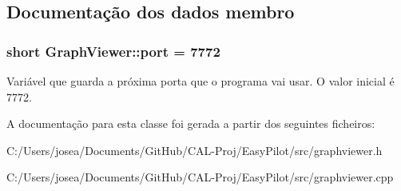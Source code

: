 \subsection{Documentação dos dados membro}
\hypertarget{class_graph_viewer_a89d0abe75f41feededc49497cc514342}{}
\subsubsection[{port}]{\setlength{\rightskip}{0pt plus 5cm}short Graph\+Viewer\+::port = 7772\hspace{0.3cm}{\ttfamily [static]}}\label{class_graph_viewer_a89d0abe75f41feededc49497cc514342}
Variável que guarda a próxima porta que o programa vai usar. O valor inicial é 7772. 

A documentação para esta classe foi gerada a partir dos seguintes ficheiros\+:\begin{DoxyCompactItemize}
\item 
C\+:/\+Users/josea/\+Documents/\+Git\+Hub/\+C\+A\+L-\/\+Proj/\+Easy\+Pilot/src/graphviewer.\+h\item 
C\+:/\+Users/josea/\+Documents/\+Git\+Hub/\+C\+A\+L-\/\+Proj/\+Easy\+Pilot/src/graphviewer.\+cpp\end{DoxyCompactItemize}
